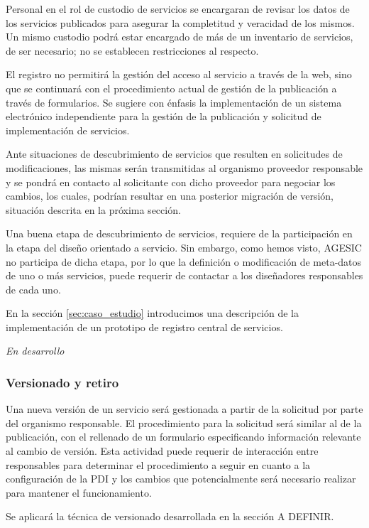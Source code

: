 \documentclass[11pt]{article}
\begin{document}
				Personal en el rol de custodio de servicios se encargaran de revisar los datos de los servicios publicados para asegurar la completitud y veracidad de los mismos. Un mismo custodio podrá estar encargado de más de un inventario de servicios, de ser necesario; no se establecen restricciones al respecto.

				El registro no permitirá la gestión del acceso al servicio a través de la web, sino que se continuará con el procedimiento actual de gestión de la publicación a través de formularios. Se sugiere con énfasis la implementación de un sistema electrónico independiente para la gestión de la publicación y solicitud de implementación de servicios.

				Ante situaciones de descubrimiento de servicios que resulten en solicitudes de modificaciones, las mismas serán transmitidas al organismo proveedor responsable y se pondrá en contacto al solicitante con dicho proveedor para negociar los cambios, los cuales, podrían resultar en una posterior migración de versión, situación descrita en la próxima sección.

				Una buena etapa de descubrimiento de servicios, requiere de la participación en la etapa del diseño orientado a servicio. Sin embargo, como hemos visto, AGESIC no participa de dicha etapa, por lo que la definición o modificación de meta-datos de uno o más servicios, puede requerir de contactar a los diseñadores responsables de cada uno.

				En la sección \ref{sec:caso_estudio} introducimos una descripción de la implementación de un prototipo de registro central de servicios.

				\emph{En desarrollo}

			\subsubsection{Versionado y retiro}
				Una nueva versión de un servicio será gestionada a partir de la solicitud por parte del organismo responsable. El procedimiento para la solicitud será similar al de la publicación, con el rellenado de un formulario especificando información relevante al cambio de versión. Esta actividad puede requerir de interacción entre responsables para determinar el procedimiento a seguir en cuanto a la configuración de la PDI y los cambios que potencialmente será necesario realizar para mantener el funcionamiento.

				Se aplicará la técnica de versionado desarrollada en la sección A DEFINIR.
\end{document}
